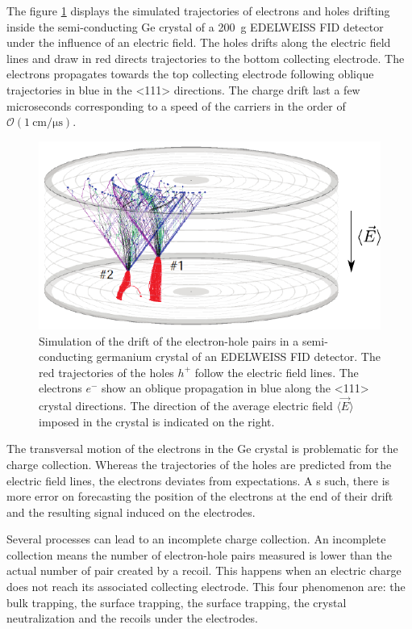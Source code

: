 The figure \ref{fig:oblique-propagation} displays the simulated trajectories of electrons and holes drifting inside the semi-conducting Ge crystal of a \SI{200}{\g} EDELWEISS FID detector under the influence of an electric field. The holes drifts along the electric field lines and draw in red directs trajectories to the bottom collecting electrode. The electrons propagates towards the top collecting electrode following oblique trajectories in blue in the <111> directions. The charge drift last a few microseconds corresponding to a speed of the carriers in the order of $\mathcal{O}(\SI{1}{\cm\per\micro\s})$.

\begin{figure}
\centering
\includegraphics[scale=1]{Figures/Electrodes/transversal_trajectories.pdf}
\caption{Simulation of the drift of the electron-hole pairs in a semi-conducting germanium crystal of an EDELWEISS FID detector. The red trajectories of the holes $h^+$ follow the electric field lines. The electrons $e^-$ show an oblique propagation in blue along the <111> crystal directions. The direction of the average electric field $\langle \vec{E} \rangle$ imposed in the crystal is indicated on the right.}
\label{fig:oblique-propagation}
\end{figure}

The transversal motion of the electrons in the Ge crystal is problematic for the charge collection. Whereas the trajectories of the holes are predicted from the electric field lines, the electrons deviates from expectations. A s such, there is more error on forecasting the position of the electrons at the end of their drift and the resulting signal induced on the electrodes. 

Several processes can lead to an incomplete charge collection. An incomplete collection means the number of electron-hole pairs measured is lower than the actual number of pair created by a recoil. This happens when an electric charge does not reach its associated collecting electrode. This four phenomenon are: the bulk trapping, the surface trapping, the surface trapping, the crystal neutralization and the recoils under the electrodes.

